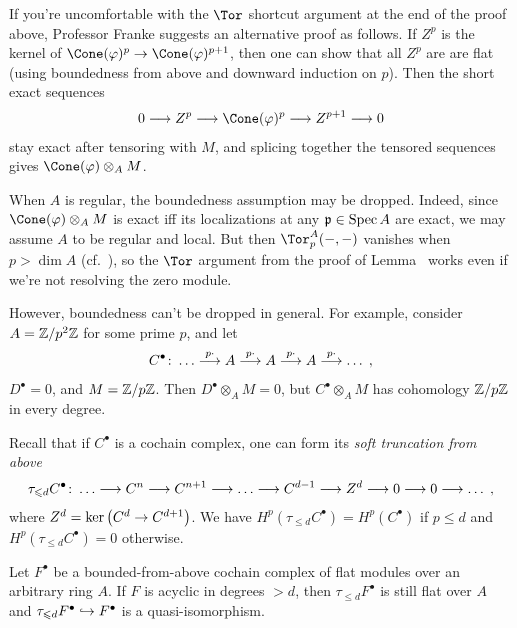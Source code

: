 \documentclass[a4paper,parskip=half,numbers=enddot, DIV=12]{scrreprt}
\renewcommand{\leq}{\leqslant}
\begin{document}
\begin{rem}
	\begin{alphanumerate}
		\item{} If you're uncomfortable with the $\Tor$ shortcut argument at the end of the proof above, Professor Franke suggests an alternative proof as follows. If $Z^p$ is the kernel of $\Cone(\phi)^p\morphism\Cone(\phi)^{p+1}$, then one can show that all $Z^p$ are are flat (using boundedness from above and downward induction on $p$). Then the short exact sequences
		\begin{align*}
			0\morphism Z^p\morphism \Cone(\phi)^p\morphism Z^{p+1}\morphism 0
		\end{align*}
		stay exact after tensoring with $M$, and splicing together the tensored sequences gives $\Cone(\phi)\otimes_AM$.
		\item When $A$ is regular, the boundedness assumption may be dropped. Indeed, since $\Cone(\phi)\otimes_AM$ is exact iff its localizations at any $\mathfrak{p}\in\operatorname{Spec} A$ are exact, we may assume $A$ to be regular and local. But then $\Tor_p^A(-,-)$ vanishes when $p>\dim A$ (cf.\ \cite[Theorem~1]{homalg}), so the $\Tor$ argument from the proof of Lemma~ works even if we're not resolving the zero module.
		
		However, boundedness can't be dropped in general. For example, consider $A=\mathbb{Z}/p^2\mathbb{Z}$ for some prime $p$, and let
		\begin{align*}
			C^\bullet\colon \ldots\morphism[ p\cdot]A\morphism[ p\cdot]A\morphism[ p\cdot]A\morphism[ p\cdot]\ldots\;,
		\end{align*}
		$D^\bullet=0$, and $M=\mathbb{Z}/p\mathbb{Z}$. Then $D^\bullet\otimes_AM=0$, but $C^\bullet\otimes_AM$ has cohomology $\mathbb{Z}/p\mathbb{Z}$ in every degree.
	\end{alphanumerate}
\end{rem}
Recall that if $C^\bullet$ is a cochain complex, one can form its \emph{soft truncation from above}
\begin{align*}
	\tau_{\leq d}C^\bullet\colon \ldots\morphism C^n\morphism C^{n+1}\morphism \ldots \morphism C^{d-1}\morphism Z^d\morphism 0\morphism 0\morphism \ldots\;,
\end{align*} 
where $Z^d=\ker\left(C^{d}\morphism C^{d+1}\right)$. We have $H^p(\tau_{\leq d}C^\bullet)=H^p(C^\bullet)$ if $p\leq d$ and $H^p(\tau_{\leq d}C^\bullet)=0$ otherwise.
\begin{lem}
	Let $F^\bullet$ be a bounded-from-above cochain complex of flat modules over an arbitrary ring $A$. If $F$ is acyclic in degrees $>d$, then $\tau_{\leq d}F^\bullet$ is still flat over $A$ and $\tau_{\leq d}F^\bullet\monomorphism F^\bullet$ is a quasi-isomorphism.
\end{lem}
\end{document}
